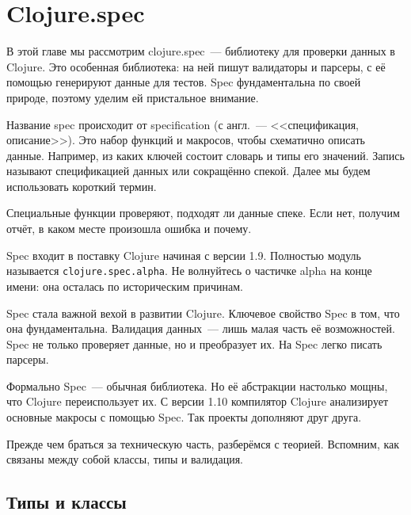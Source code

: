 \chapter{Clojure.spec}

\label{chapter-spec}


\begin{teaser}
В этой главе мы рассмотрим clojure.spec~--- библиотеку для проверки данных в
Clojure. Это особенная библиотека: на ней пишут валидаторы и парсеры, с её
помощью генерируют данные для тестов. Spec фундаментальна по своей природе,
поэтому уделим ей пристальное внимание.
\end{teaser}

Название spec происходит от specification (с англ.~--- <<спецификация, описание>>). Это
набор функций и макросов, чтобы схематично описать данные. Например, из каких
ключей состоит словарь и типы его значений. Запись называют спецификацией данных или
сокращённо спекой. Далее мы будем использовать короткий термин.

Специальные функции проверяют, подходят ли данные спеке. Если нет, получим
отчёт, в каком месте произошла ошибка и почему.


Spec входит в поставку Clojure начиная с версии 1.9. Полностью модуль называется
\verb|clojure.spec.alpha|. Не волнуйтесь о частичке alpha на конце
имени: она осталась по историческим причинам.


Spec стала важной вехой в развитии Clojure. Ключевое свойство Spec в том, что
она фундаментальна. Валидация данных~--- лишь малая часть её возможностей. Spec
не только проверяет данные, но и преобразует их. На Spec легко писать парсеры.

Формально Spec~--- обычная библиотека. Но её абстракции настолько мощны, что
Clojure переиспользует их. С версии 1.10 компилятор Clojure анализирует основные
макросы с помощью Spec. Так проекты дополняют друг друга.

Прежде чем браться за техническую часть, разберёмся с теорией. Вспомним, как
связаны между собой классы, типы и валидация.

\section{Типы и классы}

\label{type-and-pred}


